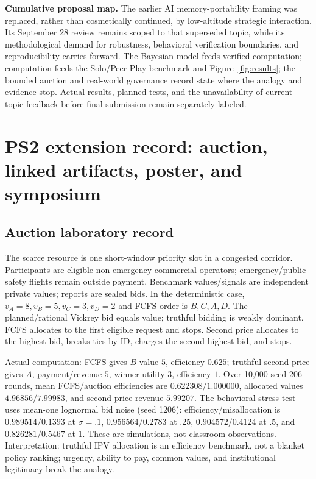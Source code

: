 \noindent\textbf{Cumulative proposal map.} The earlier AI memory-portability framing was replaced, rather than cosmetically continued, by low-altitude strategic interaction. Its September 28 review remains scoped to that superseded topic, while its methodological demand for robustness, behavioral verification boundaries, and reproducibility carries forward. The Bayesian model feeds verified computation; computation feeds the Solo/Peer Play benchmark and Figure~\ref{fig:results}; the bounded auction and real-world governance record state where the analogy and evidence stop. Actual results, planned tests, and the unavailability of current-topic feedback before final submission remain separately labeled.

\clearpage\twocolumn
\section{PS2 extension record: auction, linked artifacts, poster, and symposium}
\subsection{Auction laboratory record}
\label{app:auction}
The scarce resource is one short-window priority slot in a congested corridor. Participants are eligible non-emergency commercial operators; emergency/public-safety flights remain outside payment. Benchmark values/signals are independent private values; reports are sealed bids. In the deterministic case, $v_A=8,v_B=5,v_C=3,v_D=2$ and FCFS order is $B,C,A,D$. The planned/rational Vickrey bid equals value; truthful bidding is weakly dominant. FCFS allocates to the first eligible request and stops. Second price allocates to the highest bid, breaks ties by ID, charges the second-highest bid, and stops.

Actual computation: FCFS gives $B$ value $5$, efficiency $0.625$; truthful second price gives $A$, payment/revenue $5$, winner utility $3$, efficiency $1$. Over 10,000 seed-206 rounds, mean FCFS/auction efficiencies are $0.622308/1.000000$, allocated values $4.96856/7.99983$, and second-price revenue $5.99207$. The behavioral stress test uses mean-one lognormal bid noise (seed 1206): efficiency/misallocation is $0.989514/0.1393$ at $\sigma=.1$, $0.956564/0.2783$ at $.25$, $0.904572/0.4124$ at $.5$, and $0.826281/0.5467$ at $1$. These are simulations, not classroom observations. Interpretation: truthful IPV allocation is an efficiency benchmark, not a blanket policy ranking; urgency, ability to pay, common values, and institutional legitimacy break the analogy.

